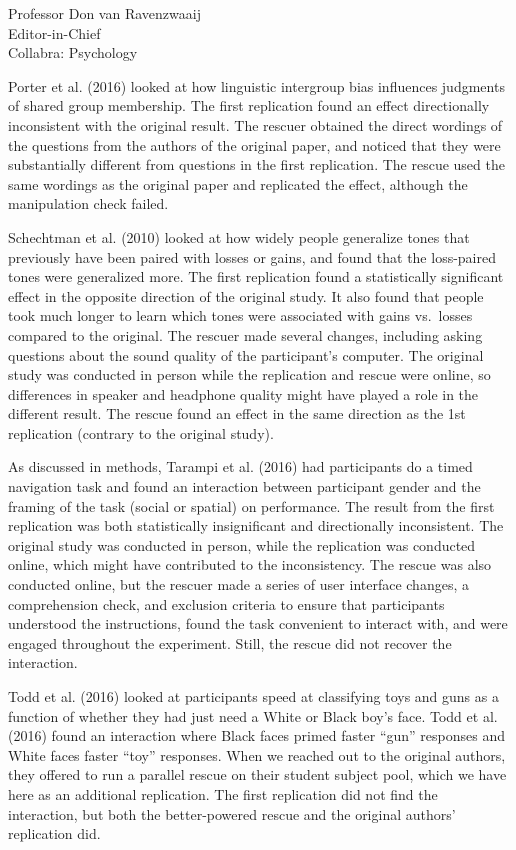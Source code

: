 \documentclass{stanfordletter}
\begin{document}
\begin{letter}{Professor Don van Ravenzwaaij \\ Editor-in-Chief \\ Collabra: Psychology }
{		 	Porter et al. (2016) looked at how linguistic intergroup bias influences judgments of shared group membership.
		 	The first replication found an effect directionally inconsistent with the original result.
		 	The rescuer obtained the direct wordings of the questions from the authors of the original paper, and noticed that they were substantially different from questions in the first replication.
		 	The rescue used the same wordings as the original paper and replicated the effect, although the manipulation check failed.
		 	\newline
		 	
		 	Schechtman et al. (2010) looked at how widely people generalize tones that previously have been paired with losses or gains, and found that the loss-paired tones were generalized more.
		 	The first replication found a statistically significant effect in the opposite direction of the original study.
		 	It also found that people took much longer to learn which tones were associated with gains vs.~losses compared to the original.
		 	The rescuer made several changes, including asking questions about the sound quality of the participant's computer.
		 	The original study was conducted in person while the replication and rescue were online, so differences in speaker and headphone quality might have played a role in the different result.
		 	The rescue found an effect in the same direction as the 1st replication (contrary to the original study).
		 	\newline
		 	
		 	As discussed in methods, Tarampi et al. (2016) had participants do a timed navigation task and found an interaction between participant gender and the framing of the task (social or spatial) on performance.
		 	The result from the first replication was both statistically insignificant and directionally inconsistent.
		 	The original study was conducted in person, while the replication was conducted online, which might have contributed to the inconsistency.
		 	The rescue was also conducted online, but the rescuer made a series of user interface changes, a comprehension check, and exclusion criteria to ensure that participants understood the instructions, found the task convenient to interact with, and were engaged throughout the experiment.
		 	Still, the rescue did not recover the interaction.
		 	\newline
		 
		 	Todd et al. (2016) looked at participants speed at classifying toys and guns as a function of whether they had just need a White or Black boy's face.
		 	Todd et al. (2016) found an interaction where Black faces primed faster ``gun'' responses and White faces faster ``toy'' responses.
		 	When we reached out to the original authors, they offered to run a parallel rescue on their student subject pool, which we have here as an additional replication.
		 	The first replication did not find the interaction, but both the better-powered rescue and the original authors' replication did.
		 	\newline
		 	
}
\end{letter}
\end{document}
